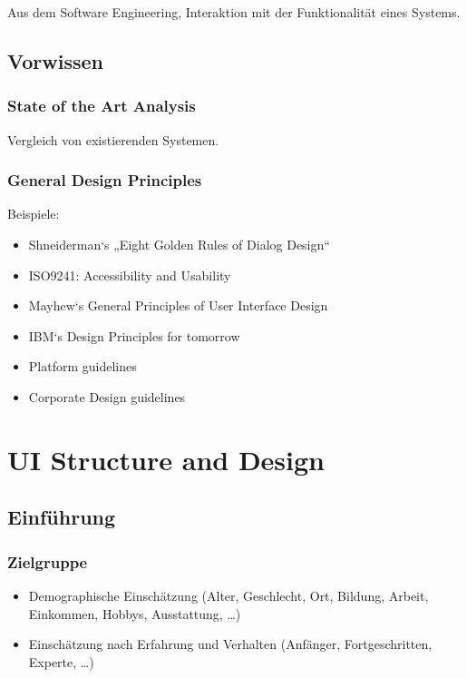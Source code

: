 Aus dem Software Engineering, Interaktion mit der Funktionalität eines
Systems.

\subsection{Vorwissen}

\subsubsection{State of the Art Analysis}

Vergleich von existierenden Systemen.

\subsubsection{General Design Principles}

Beispiele:

\begin{itemize}
\item
  Shneiderman`s „Eight Golden Rules of Dialog Design``
\item
  ISO9241: Accessibility and Usability
\item
  Mayhew`s General Principles of User Interface Design
\item
  IBM`s Design Principles for tomorrow
\item
  Platform guidelines
\item
  Corporate Design guidelines
\end{itemize}

\section{UI Structure and Design}

\subsection{Einführung}

\subsubsection{Zielgruppe}

\begin{itemize}
\item
  Demographische Einschätzung (Alter, Geschlecht, Ort, Bildung, Arbeit,
  Einkommen, Hobbys, Ausstattung, \ldots{})
\item
  Einschätzung nach Erfahrung und Verhalten (Anfänger, Fortgeschritten,
  Experte, \ldots{})
\end{itemize}

